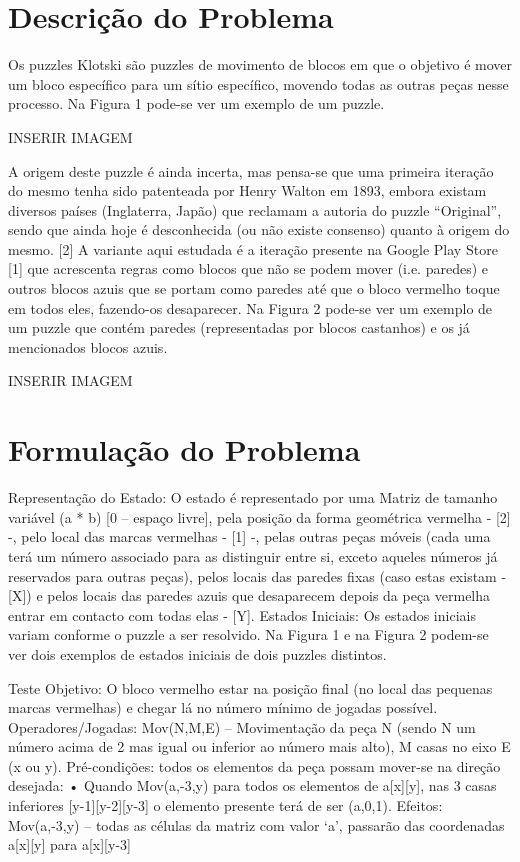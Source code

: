 \documentclass[conference]{IEEEtran}
\begin{document}
\section{Descrição do Problema}
Os puzzles Klotski são puzzles de movimento de blocos em que o objetivo é mover um bloco específico para um sítio específico, movendo todas as outras peças nesse processo. Na Figura 1 pode-se ver um exemplo de um puzzle.

INSERIR IMAGEM

A origem deste puzzle é ainda incerta, mas pensa-se que uma primeira iteração do mesmo tenha sido patenteada por Henry Walton em 1893, embora existam diversos países (Inglaterra, Japão) que reclamam a autoria do puzzle “Original”, sendo que ainda hoje é desconhecida (ou não existe consenso) quanto à origem do mesmo. [2]
A variante aqui estudada é a iteração presente na Google Play Store [1] que acrescenta regras como blocos que não se podem mover (i.e. paredes) e outros blocos azuis que se portam como paredes até que o bloco vermelho toque em todos eles, fazendo-os desaparecer. Na Figura 2 pode-se ver um exemplo de um puzzle que contém paredes (representadas por blocos castanhos) e os já mencionados blocos azuis.


INSERIR IMAGEM



\section{Formulação do Problema}
Representação do Estado: O estado é representado por uma Matriz de tamanho variável (a * b) [0 – espaço livre], pela posição da forma geométrica vermelha - [2] -, pelo local das marcas vermelhas - [1] -, pelas outras peças móveis (cada uma terá um número associado para as distinguir entre si, exceto aqueles números já reservados para outras peças), pelos locais das paredes fixas (caso estas existam - [X]) e pelos locais das paredes azuis que desaparecem depois da peça vermelha entrar em contacto com todas elas - [Y].
Estados Iniciais: Os estados iniciais variam conforme o puzzle a ser resolvido. Na Figura 1 e na Figura 2 podem-se ver dois exemplos de estados iniciais de dois puzzles distintos.

Teste Objetivo: O bloco vermelho estar na posição final (no local das pequenas marcas vermelhas) e chegar lá no número mínimo de jogadas possível.
Operadores/Jogadas: Mov(N,M,E) – Movimentação da peça N (sendo N um número acima de 2 mas igual ou inferior ao número mais alto), M casas no eixo E (x ou y).
Pré-condições: todos os elementos da peça possam mover-se na direção desejada:
• Quando Mov(a,-3,y) para todos os elementos de a[x][y], nas 3 casas inferiores [y-1][y-2][y-3] o elemento presente terá de ser (a,0,1).
Efeitos: Mov(a,-3,y) – todas as células da matriz com valor ‘a’, passarão das coordenadas a[x][y] para a[x][y-3]
\end{document}
